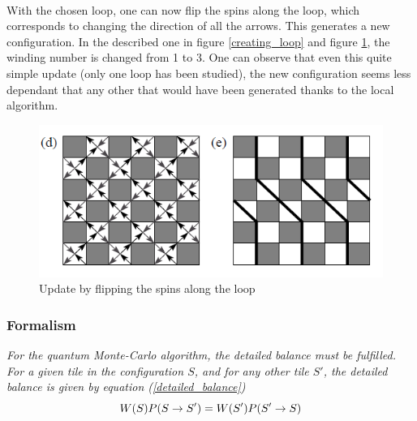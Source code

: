 \documentclass[a4paper,12pt,twoside]{article}
\begin{document}
{	\paragraph{}
	With the chosen loop, one can now flip the spins along the loop, which corresponds to changing the direction of all the arrows. This generates a new configuration. In the described one in figure \ref{creating_loop} and figure \ref{loop_update}, the winding number is changed from 1 to 3. One can observe that even this quite simple update (only one loop has been studied), the new configuration seems less dependant that any other that would have been generated thanks to the local algorithm. 
	\begin{figure}[!h]
		\centering
		\includegraphics[]{loop_update.png}
		\caption{Update by flipping the spins along the loop}
		\label{loop_update}
	\end{figure}

	\subsubsection{Formalism}
	\emph{For the quantum Monte-Carlo algorithm, the detailed balance must be fulfilled. For a given tile in the configuration $S$, and for any other tile $S'$, the detailed balance is given by equation (\ref{detailed_balance})}
	\begin{equation}
		\centering
		W(S)P(S\rightarrow S') = W(S')P(S'\rightarrow S)
		\label{detailed_balance}
	\end{equation}
}
\end{document}
